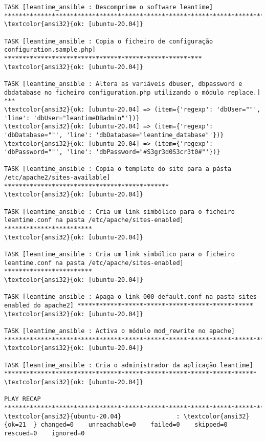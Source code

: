 \documentclass{scrartcl}
\begin{document}
\begin{Verbatim}
TASK [leantime_ansible : Descomprime o software leantime] ********************************************************************************
\textcolor{ansi32}{ok: [ubuntu-20.04]}

TASK [leantime_ansible : Copia o ficheiro de configuração configuration.sample.php] ******************************************************
\textcolor{ansi32}{ok: [ubuntu-20.04]}

TASK [leantime_ansible : Altera as variáveis dbuser, dbpassword e dbdatabase no ficheiro configuration.php utilizando o módulo replace.] ***
\textcolor{ansi32}{ok: [ubuntu-20.04] => (item={'regexp': 'dbUser=""', 'line': 'dbUser="leantimeDBadmin"'})}
\textcolor{ansi32}{ok: [ubuntu-20.04] => (item={'regexp': 'dbDatabase=""', 'line': 'dbDatabase="leantime_database"'})}
\textcolor{ansi32}{ok: [ubuntu-20.04] => (item={'regexp': 'dbPassword=""', 'line': 'dbPassword="#S3gr3d0S3cr3t0#"'})}

TASK [leantime_ansible : Copia o template do site para a pásta /etc/apache2/sites-available] *********************************************
\textcolor{ansi32}{ok: [ubuntu-20.04]}

TASK [leantime_ansible : Cria um link simbólico para o ficheiro leantime.conf na pasta /etc/apache/sites-enabled] ************************
\textcolor{ansi32}{ok: [ubuntu-20.04]}

TASK [leantime_ansible : Cria um link simbólico para o ficheiro leantime.conf na pasta /etc/apache/sites-enabled] ************************
\textcolor{ansi32}{ok: [ubuntu-20.04]}

TASK [leantime_ansible : Apaga o link 000-default.conf na pasta sites-enabled do apache2] ************************************************
\textcolor{ansi32}{ok: [ubuntu-20.04]}

TASK [leantime_ansible : Activa o módulo mod_rewrite no apache] **************************************************************************
\textcolor{ansi32}{ok: [ubuntu-20.04]}

TASK [leantime_ansible : Cria o administrador da aplicação leantime] *********************************************************************
\textcolor{ansi32}{ok: [ubuntu-20.04]}

PLAY RECAP *******************************************************************************************************************************
\textcolor{ansi32}{ubuntu-20.04}               : \textcolor{ansi32}{ok=21  } changed=0    unreachable=0    failed=0    skipped=0    rescued=0    ignored=0


\end{Verbatim}
\end{document}
